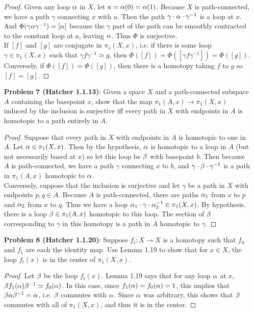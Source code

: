 \documentclass{amsart}
\begin{document}
\begin{proof}
	Given any loop $\alpha$ in $X$, let $a=\alpha(0)=\alpha(1)$. Because $X$ is path-connected, we have a path $\gamma$ connecting $x$ with $a$. Then the path $\gamma \cdot \alpha \cdot \gamma^{-1}$ is a loop at $x$. And $\Phi(\gamma \alpha\gamma^{-1})=[\alpha]$ because the $\gamma$ part of the path can be smoothly contracted to the constant loop at $a$, leaving $\alpha$. Thus $\Phi$ is surjective.\\
	
	If $[f]$ and $[g]$ are conjugate in $\pi_1(X,x)$, i.e. if there is some loop $\gamma\in \pi_1(X,x)$ such that $\gamma f \gamma^{-1}\simeq g$, then $\Phi([f]) = \Phi([\gamma f \gamma^{-1}]) = \Phi([g])$. Conversely, if $\Phi([f])=\Phi([g])$, then there is a homotopy taking $f$ to $g$ so $[f]=[g]$.
\end{proof}

\newpage 


\noindent \textbf{Problem 7 (Hatcher 1.1.13)}: Given a space $X$ and a path-connected subspace $A$ containing the basepoint $x$, show that the map $\pi_1(A,x)\to \pi_1(X,x)$ induced by the inclusion is surjective iff every path in $X$ with endpoints in $A$ is homotopic to a path entirely in $A$.
\begin{proof}
	Suppose that every path in $X$ with endpoints in $A$ is homotopic to one in $A$. Let $\alpha\in \pi_1(X,x)$. Then by the hypothesis, $\alpha$ is homotopic to a loop in $A$ (but not necessarily based at $x$) so let this loop be $\beta$ with basepoint $b$. Then because $A$ is path-connected, we have a path $\gamma$ connecting $x$ to $b$, and $\gamma\cdot \beta \cdot \gamma^{-1}$ is a path in $\pi_1(A,x)$ homotopic to $\alpha$.\\
	
	Conversely, suppose that the inclusion is surjective and let $\gamma$ be a path in $X$ with endpoints $p,q\in A$. Because $A$ is path-connected, there are paths $\alpha_1$ from $x$ to $p$ and $\alpha_2$ from $x$ to $q$. Thus we have a loop $\alpha_1 \cdot \gamma \cdot \alpha_2^{-1}\in \pi_1(X,x)$. By hypothesis, there is a loop $\beta\in \pi_1(A,x)$ homotopic to this loop. The section of $\beta$ corresponding to $\gamma$ in this homotopy is a path in $A$ homotopic to $\gamma$.  
\end{proof}

\newpage 


\noindent \textbf{Problem 8 (Hatcher 1.1.20)}: Suppose $f_t:X\to X$ is a homotopy such that $f_0$ and $f_1$ are each the identity map. Use Lemma 1.19 to show that for $x\in X$, the loop $f_t(x)$ is in the center of $\pi_1(X,x)$.
\begin{proof}
	Let $\beta$ be the loop $f_t(x)$. Lemma 1.19 says that for any loop $\alpha$ at $x$, $\beta f_1(\alpha) \beta^{-1} \simeq f_0(\alpha)$. In this case, since $f_1(\alpha)=f_0(\alpha)=1$, this implies that $\beta \alpha \beta^{-1}=\alpha$, i.e. $\beta$ commutes with $\alpha$. Since $\alpha$ was arbitrary, this shows that $\beta$ commutes with all of $\pi_1(X,x)$, and thus it is in the center. 
\end{proof}
\end{document}
